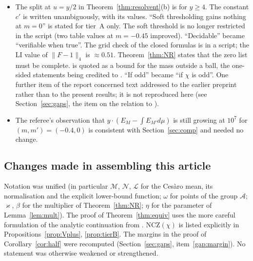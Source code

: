 \documentclass[11pt]{amsart}
\theoremstyle{definition}
\numberwithin{equation}{section}
\newcommand{\cA}{\mathcal A}          %
\newcommand{\cM}{\mathcal M}          %
\newcommand{\cN}{\mathcal N}          %
\newcommand{\cL}{\mathcal L}          %
\begin{document}
\begin{itemize}
\cite[Theorem~1.5(a)]{MN20} is a two-way statement; their definition
is on the multiset; the set-based definition used here is
\cite[Definition~5.3]{Dev20}.
\item[Minor.] The split at $u=y/2$ in
Theorem~\ref{thm:resolvent}(b) is for $y\ge4$. The constant $c'$ is
written unambiguously, with its values. ``Soft thresholding gains
nothing at $m=0$'' is stated for tier~A only. The soft threshold is
no longer restricted in the script (two table values at $m=-0.45$
improved). ``Decidable'' became ``verifiable when true''. The grid
check of the closed formulas is in a script; the LI value of
$\|F-1\|_4$ is $\approx0.51$. Theorem~\ref{thm:NR} states that the
zero list must be complete. \cite[Theorem~1.2]{RS94} is quoted as a
bound for the mass outside a ball, the one-sided statements being
credited to \cite[Theorem~2.5(1)]{Dev20}. ``If odd'' became ``if
$\chi$ is odd''. One further item of the report concerned text
addressed to the earlier preprint \cite{WR} rather than to the
present results; it is not reproduced here (see
Section~\ref{sec:gaps}, the item on the relation to \cite{WR}).
\item[Not done.] The referee's observation that
$y\cdot(E_M-\int E_{M'}d\mu)$ is still growing at $10^7$ for
$(m,m')=(-0.4,0)$ is consistent with Section~\ref{sec:comp} and
needed no change.
\end{itemize}

\subsection*{Changes made in assembling this article}
Notation was unified (in particular $\cM$, $\cN$, $\cL$ for the
Ces\`aro mean, its normalisation and the explicit lower-bound
function; $\omega$ for points of the group $\cA$; $\varkappa$,
$\beta$ for the multiplier of Theorem~\ref{thm:NR}; $\eta$ for the
parameter of Lemma~\ref{lem:mult}). The proof of
Theorem~\ref{thm:equiv} uses the more careful formulation of the
analytic continuation from \cite[the Landau-type converse]{MC}. NCZ$(\chi)$ is
listed explicitly in
Propositions~\ref{prop:Vplus}, \ref{prop:tierB}. The margins in the
proof of Corollary~\ref{cor:half} were recomputed
(Section~\ref{sec:gaps}, item~\ref{gap:margin}). No statement was
otherwise weakened or strengthened.
\end{document}
